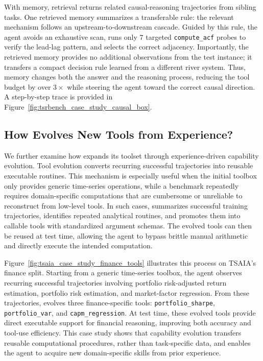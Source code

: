 With memory, retrieval returns related causal-reasoning trajectories from
sibling tasks. One retrieved memory summarizes a transferable rule: the relevant
mechanism follows an upstream-to-downstream cascade. Guided by this rule, the
agent avoids an exhaustive scan, runs only $7$ targeted \texttt{compute\_acf}
probes to verify the lead-lag pattern, and selects the correct adjacency. 
Importantly, the retrieved memory provides no additional observations from the
test instance; it transfers a compact decision rule learned from a different
river system. Thus, memory changes both the answer and the reasoning process,
reducing the tool budget by over $3\times$ while steering the agent toward the
correct causal direction. A step-by-step trace is provided in
Figure~\ref{fig:tsrbench_case_study_causal_box}.








\subsection{How \method{} Evolves New Tools from Experience?}

We further examine how \method{} expands its toolset through experience-driven capability evolution. 
Tool evolution converts recurring successful trajectories into reusable executable routines. 
This mechanism is especially useful when the initial toolbox only provides generic time-series operations, while a benchmark repeatedly requires domain-specific computations that are cumbersome or unreliable to reconstruct from low-level tools. 
In such cases, \method{} summarizes successful training trajectories, identifies repeated analytical routines, and promotes them into callable tools with standardized argument schemas. 
The evolved tools can then be reused at test time, allowing the agent to bypass brittle manual arithmetic and directly execute the intended computation.

Figure~\ref{fig:tsaia_case_study_finance_tools} illustrates this process on TSAIA's finance split. 
Starting from a generic time-series toolbox, the agent observes recurring successful trajectories involving portfolio risk-adjusted return estimation, portfolio risk estimation, and market-factor regression. 
From these trajectories, \method{} evolves three finance-specific tools: \texttt{portfolio\_sharpe}, \texttt{portfolio\_var}, and \texttt{capm\_regression}. 
At test time, these evolved tools provide direct executable support for financial reasoning, improving both accuracy and tool-use efficiency. 
This case study shows that capability evolution transfers reusable computational procedures, rather than task-specific data, and enables the agent to acquire new domain-specific skills from prior experience.













